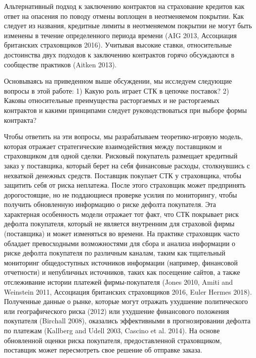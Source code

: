 \documentclass[a4paper,12pt]{article}
\begin{document}
Альтернативный подход к заключению контрактов на страхование кредитов как ответ на опасения по поводу отмены воплощен в неотменяемом покрытии. Как следует из названия, кредитные лимиты в неотменяемом покрытии не могут быть изменены в течение определенного периода времени (AIG 2013, Ассоциация британских страховщиков 2016). Учитывая высокие ставки, относительные достоинства двух подходов к заключению контрактов горячо обсуждаются в сообществе практиков (Aitken 2013).

Основываясь на приведенном выше обсуждении, мы исследуем следующие вопросы в этой работе: 1) Какую роль играет СТК в цепочке поставок? 2) Каковы относительные преимущества расторгаемых и не расторгаемых контрактов и какими принципами следует руководствоваться при выборе формы контракта?

Чтобы ответить на эти вопросы, мы разрабатываем теоретико-игровую модель, которая отражает стратегические взаимодействия между поставщиком и страховщиком для одной сделки. Рисковый покупатель размещает кредитный заказ у поставщика, который берет на себя финансовые расходы, столкнувшись с нехваткой денежных средств. Поставщик покупает СТК у страховщика, чтобы защитить себя от риска неплатежа. После этого страховщик может предпринять дорогостоящие, но не поддающиеся проверке усилия по мониторингу, чтобы получить обновленную информацию о риске дефолта покупателя. Эта характерная особенность модели отражает тот факт, что СТК покрывает риск дефолта покупателя, который не является внутренним для страховой фирмы (поставщика) и может изменяться во времени. На практике страховщик часто обладает превосходными возможностями для сбора и анализа информации о риске дефолта покупателя по различным каналам, таким как тщательный мониторинг общедоступных источников информации (например, финансовой отчетности) и непубличных источников, таких как посещение сайтов, а также отслеживание истории платежей фирмы-покупателя (Jones 2010, Amiti and Weinstein 2011, Ассоциация британских страховщиков 2016, Euler Hermes 2018). Полученные данные о рынке, которые могут отражать ухудшение политического или географического риска (2012) или ухудшение финансового положения покупателя (Birchall 2008), оказались эффективными в прогнозировании дефолта по платежам (Kallberg and Udell 2003, Cascino et al. 2014). На основе обновленной оценки риска покупателя, предоставленной страховщиком, поставщик может пересмотреть свое решение об отправке заказа.
\end{document}
